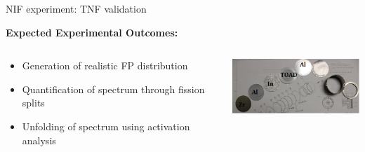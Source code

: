 \documentclass[xcolor=x11names,compress]{beamer}
\renewcommand{\(}{\begin{columns}}
\renewcommand{\)}{\end{columns}}
\newcommand{\<}[1]{\begin{column}{#1}}
\renewcommand{\>}{\end{column}}
\begin{document}
\begin{frame}{NIF experiment: TNF validation}

    \textbf{Expected Experimental Outcomes:}
      \begin{columns}
        \begin{column}{0.5\linewidth}
          \vspace{-0.15	cm} 
          \begin{itemize}
            \item Generation of realistic FP distribution
            \item Quantification of spectrum through fission splits
            \item Unfolding of spectrum using activation analysis
          \end{itemize}
        \end{column}
        
        \begin{column}{0.5\linewidth}
          \includegraphics[width=2.0in]{../figs/NAS2.png}
        \end{column}
      \end{columns}
\end{frame}
\end{document}
